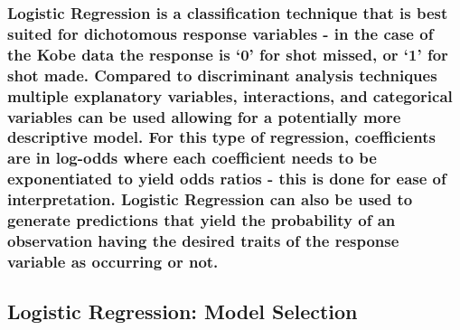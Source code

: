 \documentclass[american,]{article}
\begin{document}
\hypertarget{logistic-regression-is-a-classification-technique-that-is-best-suited-for-dichotomous-response-variables---in-the-case-of-the-kobe-data-the-response-is-0-for-shot-missed-or-1-for-shot-made.-compared-to-discriminant-analysis-techniques-multiple-explanatory-variables-interactions-and-categorical-variables-can-be-used-allowing-for-a-potentially-more-descriptive-model.-for-this-type-of-regression-coefficients-are-in-log-odds-where-each-coefficient-needs-to-be-exponentiated-to-yield-odds-ratios---this-is-done-for-ease-of-interpretation.-logistic-regression-can-also-be-used-to-generate-predictions-that-yield-the-probability-of-an-observation-having-the-desired-traits-of-the-response-variable-as-occurring-or-not.}{%
\subsubsection{Logistic Regression is a classification technique that is best suited for dichotomous response variables - in the case of the Kobe data the response is `0' for shot missed, or `1' for shot made. Compared to discriminant analysis techniques multiple explanatory variables, interactions, and categorical variables can be used allowing for a potentially more descriptive model. For this type of regression, coefficients are in log-odds where each coefficient needs to be exponentiated to yield odds ratios - this is done for ease of interpretation. Logistic Regression can also be used to generate predictions that yield the probability of an observation having the desired traits of the response variable as occurring or not.}\label{logistic-regression-is-a-classification-technique-that-is-best-suited-for-dichotomous-response-variables---in-the-case-of-the-kobe-data-the-response-is-0-for-shot-missed-or-1-for-shot-made.-compared-to-discriminant-analysis-techniques-multiple-explanatory-variables-interactions-and-categorical-variables-can-be-used-allowing-for-a-potentially-more-descriptive-model.-for-this-type-of-regression-coefficients-are-in-log-odds-where-each-coefficient-needs-to-be-exponentiated-to-yield-odds-ratios---this-is-done-for-ease-of-interpretation.-logistic-regression-can-also-be-used-to-generate-predictions-that-yield-the-probability-of-an-observation-having-the-desired-traits-of-the-response-variable-as-occurring-or-not.}}

\hypertarget{logistic-regression-model-selection}{%
\subsection{\texorpdfstring{\textbf{Logistic Regression: Model Selection}}{Logistic Regression: Model Selection}}\label{logistic-regression-model-selection}}
\end{document}
